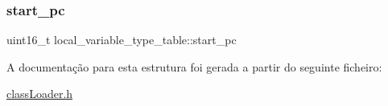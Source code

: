\hypertarget{structlocal__variable__type__table_a60409ae355abc4acfa5d6f6eeb1e5a32}{}\label{structlocal__variable__type__table_a60409ae355abc4acfa5d6f6eeb1e5a32} 
\subsubsection{\texorpdfstring{start\+\_\+pc}{start\_pc}}
{\footnotesize\ttfamily uint16\+\_\+t local\+\_\+variable\+\_\+type\+\_\+table\+::start\+\_\+pc}



A documentação para esta estrutura foi gerada a partir do seguinte ficheiro\+:\begin{DoxyCompactItemize}
\item 
\hyperlink{class_loader_8h}{class\+Loader.\+h}\end{DoxyCompactItemize}
